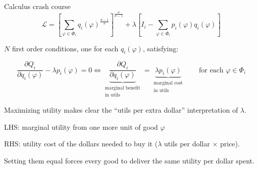 \documentclass[notes,11pt, aspectratio=169, xcolor=table]{beamer}
\newenvironment{wideitemize}{\itemize\addtolength{\itemsep}{10pt}}{\enditemize}
\begin{document}
\begin{frame}{Calculus crash course}
    \begin{equation*}
    \mathcal{L} = \left[ \sum_{\varphi \in \Phi_i } q_i(
    \varphi)^{\tfrac{\sigma-1}{\sigma}} \right]^{\tfrac{\sigma}{\sigma-1} } + \lambda \left[ I_i - \sum_{\varphi \in \Phi_i } p_i(\varphi) q_i(\varphi) \right]
    \end{equation*}

\begin{wideitemize}
    \item $N$ first order conditions, one for each $q_{i}(\varphi)$, satisfying:

\begin{equation*}
    \frac{\partial Q_i}{\partial q_{i}(\varphi)} - \lambda p_i(\varphi) =0 \iff \underbrace{\frac{\partial Q_i}{\partial q_{i}(\varphi)}}_{\substack{\text{marginal benefit} \\ \text{in utils}}} = \underbrace{\lambda p_i(\varphi)}_{\substack{\text{marginal cost} \\ \text{in utils}}} \qquad \text{for each } \varphi \in \Phi_i
\end{equation*}

    \item<2-> Maximizing utility makes clear the ``utils per extra dollar'' interpretation of $\lambda$.
    
    \item<3-> LHS: marginal utility from one more unit of good $\varphi$
    
    \item<4-> RHS: utility cost of the dollars needed to buy it ($\lambda$ utils per dollar $\times$ price). 
    
    \item<5-> Setting them equal forces every good to deliver the same utility per dollar spent.

\end{wideitemize}
    
\end{frame}
\end{document}
